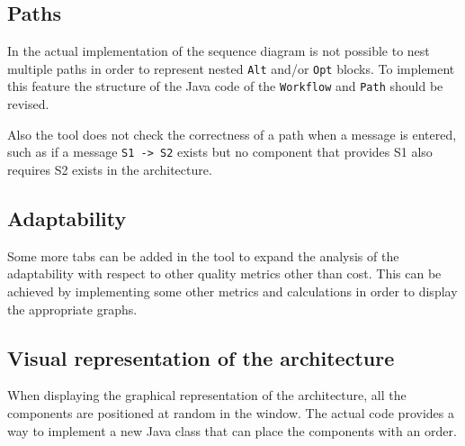 \subsection{Paths}
In the actual implementation of the sequence diagram is not possible to nest multiple paths in order to represent nested \texttt{Alt} and/or \texttt{Opt} blocks. To implement this feature the structure of the Java code of the \texttt{Workflow} and \texttt{Path} should be revised.

Also the tool does not check the correctness of a path when a message is entered, such as if a message \texttt{S1 -> S2} exists but no component that provides S1 also requires S2 exists in the architecture.

\subsection{Adaptability}
Some more tabs can be added in the tool to expand the analysis of the adaptability with respect to other quality metrics other than cost. This can be achieved by implementing some other metrics and calculations in order to display the appropriate graphs.

\subsection{Visual representation of the architecture}
When displaying the graphical representation of the architecture, all the components are positioned at random in the window. The actual code provides a way to implement a new Java class that can place the components with an order.